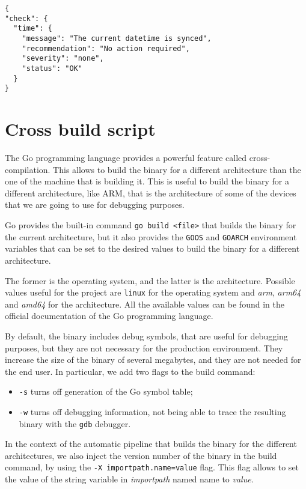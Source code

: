 \begin{lstlisting}[style=json, caption={Output of the datetime module}]
{
"check": {
  "time": {
    "message": "The current datetime is synced",
    "recommendation": "No action required",
    "severity": "none",
    "status": "OK"
  }
}
\end{lstlisting}

\section{Cross build script}

The Go programming language provides a powerful feature called cross-compilation. This allows to build the binary for a different architecture than the one of the machine that is building it. This is useful to build the binary for a different architecture, like ARM, that is the architecture of some of the devices that we are going to use for debugging purposes.

Go provides the built-in command \texttt{go build <file>} that builds the binary for the current architecture, but it also provides the \texttt{GOOS} and \texttt{GOARCH} environment variables that can be set to the desired values to build the binary for a different architecture.

The former is the operating system, and the latter is the architecture. Possible values useful for the project are \texttt{linux} for the operating system and \textit{arm}, \textit{arm64} and \textit{amd64} for the architecture. All the available values can be found in the official documentation of the Go programming language.~\cite{go-valid-goos-goarch-combinations}

By default, the binary includes debug symbols, that are useful for debugging purposes, but they are not necessary for the production environment. They increase the size of the binary of several megabytes, and they are not needed for the end user. In particular, we add two flags to the build command:~\cite{go-ldflags-all,go-ldflags-s-w}
\begin{itemize}
  \item \texttt{-s} turns off generation of the Go symbol table;
  \item \texttt{-w} turns off debugging information, not being able to trace the resulting binary with the \texttt{gdb} debugger.
\end{itemize}

In the context of the automatic pipeline that builds the binary for the different architectures, we also inject the version number of the binary in the build command, by using the \texttt{-X importpath.name=value} flag. This flag allows to set the value of the string variable in \textit{importpath} named name to \textit{value}.~\cite{go-ldflags-all}


